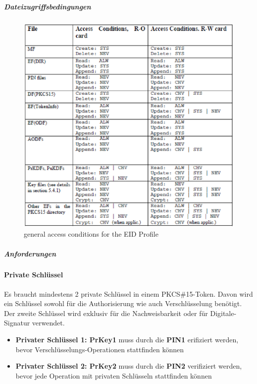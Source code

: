 \documentclass[10pt,a4paper]{article}
\begin{document}
\subparagraph{Dateizugriffsbedingungen}
\begin{figure}[ht]
    \centering
    \includegraphics[scale=0.62]{images/access-cond-eid-profile}
    \caption{general access conditions for the EID Profile}
    \label{fig:access-cond-eid-profile}
\end{figure}

\FloatBarrier

\subparagraph{Anforderungen}

\paragraph{Private Schlüssel}
Es braucht mindestens 2 private Schlüssel in einem PKCS\#15-Token. Davon wird ein Schlüssel
sowohl für die Authorisierung wie auch Verschlüsselung benötigt. Der zweite Schlüssel wird
exklusiv für die Nachweisbarkeit oder für Digitale-Signatur verwendet.

\begin{itemize}
    \item \textbf{Privater Schlüssel 1: PrKey1} muss durch die \textbf{PIN1} erifiziert
        werden, bevor Verschlüsselungs-Operationen stattfinden können
    \item \textbf{Privater Schlüssel 2: PrKey2} muss durch die \textbf{PIN2} verifiziert
        werden, bevor jede Operation mit privaten Schlüsseln stattfinden können
\end{itemize}
\end{document}
